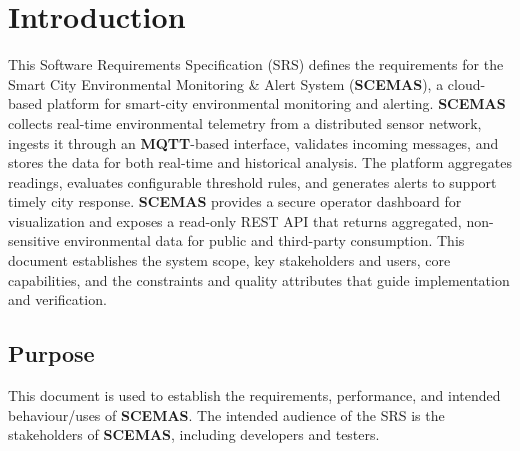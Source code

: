 \documentclass[]{article}
\begin{document}
\section{Introduction}
\label{sec:introduction}
This Software Requirements Specification (SRS) defines the requirements for the Smart City Environmental Monitoring \& Alert System (\textbf{SCEMAS}), a cloud-based platform for smart-city environmental monitoring and alerting. \textbf{SCEMAS} collects real-time environmental telemetry from a distributed sensor network, ingests it through an \textbf{MQTT}-based interface, validates incoming messages, and stores the data for both real-time and historical analysis. The platform aggregates readings, evaluates configurable threshold rules, and generates alerts to support timely city response. \textbf{SCEMAS} provides a secure operator dashboard for visualization and exposes a read-only REST API that returns aggregated, non-sensitive environmental data for public and third-party consumption. This document establishes the system scope, key stakeholders and users, core capabilities, and the constraints and quality attributes that guide implementation and verification.


\subsection{Purpose}
\label{sub:purpose}
This document is used to establish the requirements, performance, and intended behaviour/uses of \textbf{SCEMAS}.
The intended audience of the SRS is the stakeholders of \textbf{SCEMAS}, including developers and testers.
\end{document}
